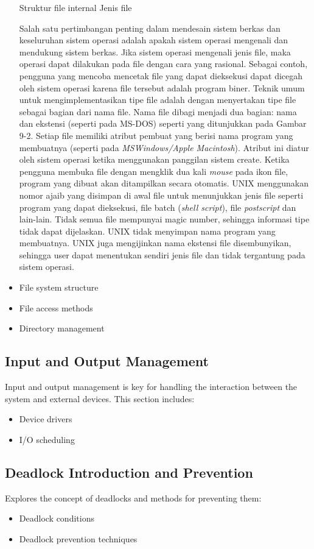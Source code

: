 \documentclass[12pt]{article}
\begin{document}
\begin{itemize}
      Struktur file internal 
      Jenis file 

      Salah satu pertimbangan penting dalam mendesain sistem berkas dan keseluruhan sistem operasi adalah apakah sistem operasi mengenali dan mendukung sistem berkas. Jika sistem operasi mengenali jenis file, maka operasi dapat dilakukan pada file dengan cara yang rasional. Sebagai contoh, pengguna yang mencoba mencetak file yang dapat dieksekusi dapat dicegah oleh sistem operasi karena file tersebut adalah program biner. Teknik umum untuk mengimplementasikan tipe file adalah dengan menyertakan tipe file sebagai bagian dari nama file. Nama file dibagi menjadi dua bagian: nama dan ekstensi (seperti pada MS-DOS) seperti yang ditunjukkan pada Gambar 9-2. Setiap file memiliki atribut pembuat yang berisi nama program yang membuatnya (seperti pada \textit{MSWindows/Apple Macintosh}). Atribut ini diatur oleh sistem operasi ketika menggunakan panggilan sistem create. Ketika pengguna membuka file dengan mengklik dua kali \textit{mouse} pada ikon file, program yang dibuat akan ditampilkan secara otomatis. UNIX menggunakan nomor ajaib yang disimpan di awal file untuk menunjukkan jenis file seperti program yang dapat dieksekusi, file batch (\textit{shell script}), file\textit{ postscript} dan lain-lain. Tidak semua file mempunyai magic number, sehingga informasi tipe tidak dapat dijelaskan. UNIX tidak menyimpan nama program yang membuatnya. UNIX juga mengijinkan nama ekstensi file disembunyikan, sehingga user dapat menentukan sendiri jenis file dan tidak tergantung pada sistem operasi. 


    \item File system structure
    \item File access methods
    \item Directory management
\end{itemize}

\subsection{Input and Output Management}
Input and output management is key for handling the interaction between the system and external devices. This section includes:
\begin{itemize}
    \item Device drivers
    \item I/O scheduling
\end{itemize}

\subsection{Deadlock Introduction and Prevention}
Explores the concept of deadlocks and methods for preventing them:
\begin{itemize}
    \item Deadlock conditions
    \item Deadlock prevention techniques
\end{itemize}
\end{document}
